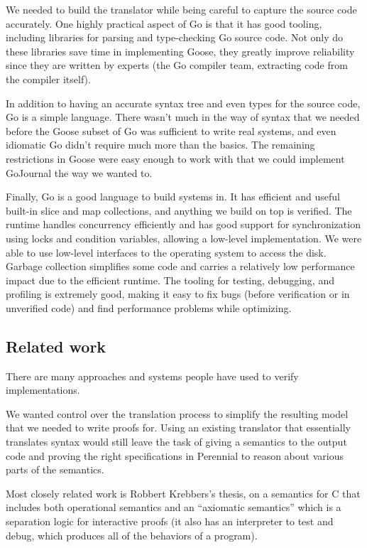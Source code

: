 We needed to build the translator while being careful to capture the
source code accurately. One highly practical aspect of Go is that it has
good tooling, including libraries for parsing and type-checking Go
source code. Not only do these libraries save time in implementing
Goose, they greatly improve reliability since they are written by
experts (the Go compiler team, extracting code from the compiler
itself).

In addition to having an accurate syntax tree and even types for the
source code, Go is a simple language. There wasn't much in the way of
syntax that we needed before the Goose subset of Go was sufficient to
write real systems, and even idiomatic Go didn't require much more than
the basics. The remaining restrictions in Goose were easy enough to work
with that we could implement GoJournal the way we wanted to.

Finally, Go is a good language to build systems in. It has efficient and
useful built-in slice and map collections, and anything we build on top
is verified. The runtime handles concurrency efficiently and has good
support for synchronization using locks and condition variables,
allowing a low-level implementation. We were able to use low-level
interfaces to the operating system to access the disk. Garbage
collection simplifies some code and carries a relatively low performance
impact due to the efficient runtime. The tooling for testing, debugging,
and profiling is extremely good, making it easy to fix bugs (before
verification or in unverified code) and find performance problems while
optimizing.

\hypertarget{related-work}{%
\subsection{Related work}\label{related-work}}

There are many approaches and systems people have used to verify
implementations.

We wanted control over the translation process to simplify the resulting
model that we needed to write proofs for. Using an existing translator
that essentially translates syntax would still leave the task of giving
a semantics to the output code and proving the right specifications in
Perennial to reason about various parts of the semantics.

Most closely related work is Robbert Krebbers's thesis, on a semantics
for C that includes both operational semantics and an ``axiomatic
semantics'' which is a separation logic for interactive proofs (it also
has an interpreter to test and debug, which produces all of the
behaviors of a program).

